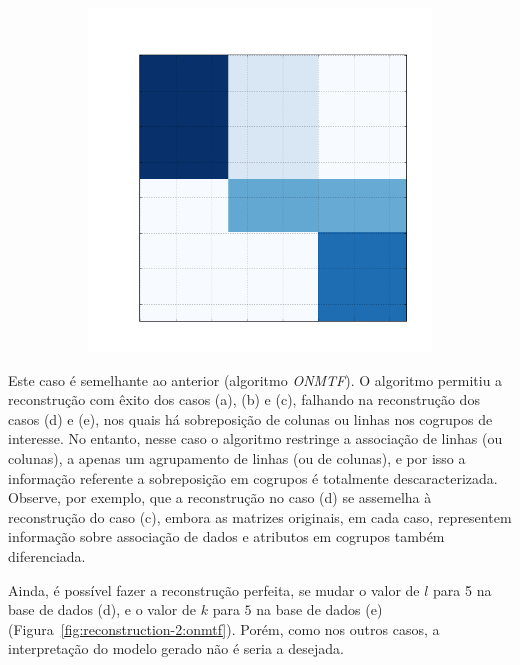 \documentclass[
    12pt,                %
    oneside,            %
    a4paper,            %
    english,            %
    brazil                %
    ]{abntex2ppgsi}
\begin{document}
\begin{figure}[H]
\begin{subfigure}[b]{0.18\textwidth}
        \caption{}
    \end{subfigure}
    \begin{subfigure}[b]{0.18\textwidth}
        \includegraphics[width=\textwidth]{img/e-reconstruction-fnmtf.png}
    \caption{}
    \end{subfigure}
    \label{fig:reconstruction:fnmtf}
\end{figure}

Este caso é semelhante ao anterior (algoritmo \textit{ONMTF}).
O algoritmo permitiu a reconstrução com êxito dos casos (a), (b) e (c), falhando na reconstrução dos casos (d) e (e), nos quais há sobreposição de colunas ou linhas nos cogrupos de interesse. No entanto, nesse caso o algoritmo restringe a associação de linhas (ou colunas), a apenas um agrupamento de linhas (ou de colunas), e por isso a informação referente a sobreposição em cogrupos é totalmente descaracterizada.
Observe, por exemplo, que a reconstrução no caso (d) se assemelha à reconstrução do caso (c), embora as matrizes originais, em cada caso, representem informação sobre associação de dados e atributos em cogrupos também diferenciada.

Ainda, é possível fazer a reconstrução perfeita, se mudar o valor de $l$ para 5 na base de dados (d), e o valor de $k$ para $5$ na base de dados (e) (Figura~\ref{fig:reconstruction-2:onmtf}).
Porém, como nos outros casos, a interpretação do modelo gerado não é seria a desejada.
\end{document}

